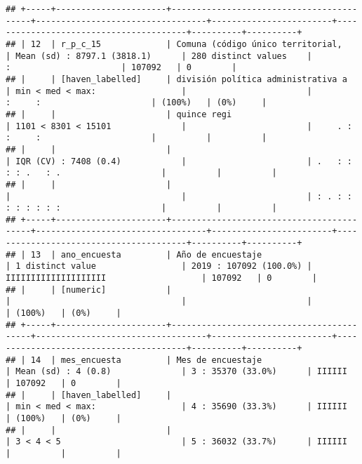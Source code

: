 \documentclass[]{article}
\begin{document}
\begin{verbatim}
## +-----+----------------------+------------------------------------------+----------------------------------+------------------------+----------------------------------------+----------+----------+
## | 12  | r_p_c_15             | Comuna (código único territorial,        | Mean (sd) : 8797.1 (3818.1)      | 280 distinct values    |                 :                      | 107092   | 0        |
## |     | [haven_labelled]     | división política administrativa a       | min < med < max:                 |                        |           :     :                      | (100%)   | (0%)     |
## |     |                      | quince regi                              | 1101 < 8301 < 15101              |                        |     . :   :     :                      |          |          |
## |     |                      |                                          | IQR (CV) : 7408 (0.4)            |                        | .   : : : : .   : .                    |          |          |
## |     |                      |                                          |                                  |                        | : . : : : : : : : :                    |          |          |
## +-----+----------------------+------------------------------------------+----------------------------------+------------------------+----------------------------------------+----------+----------+
## | 13  | ano_encuesta         | Año de encuestaje                        | 1 distinct value                 | 2019 : 107092 (100.0%) | IIIIIIIIIIIIIIIIIIII                   | 107092   | 0        |
## |     | [numeric]            |                                          |                                  |                        |                                        | (100%)   | (0%)     |
## +-----+----------------------+------------------------------------------+----------------------------------+------------------------+----------------------------------------+----------+----------+
## | 14  | mes_encuesta         | Mes de encuestaje                        | Mean (sd) : 4 (0.8)              | 3 : 35370 (33.0%)      | IIIIII                                 | 107092   | 0        |
## |     | [haven_labelled]     |                                          | min < med < max:                 | 4 : 35690 (33.3%)      | IIIIII                                 | (100%)   | (0%)     |
## |     |                      |                                          | 3 < 4 < 5                        | 5 : 36032 (33.7%)      | IIIIII                                 |          |          |

\end{verbatim}
\end{document}
